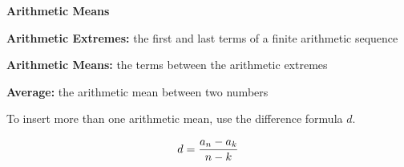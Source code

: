 \begin{center}
\textbf{Arithmetic Means}
\end{center}

\vspce


\textbf{Arithmetic Extremes:} the first and last terms of a finite arithmetic sequence 

\vspce

\textbf{Arithmetic Means:} the terms between the arithmetic extremes 

\vspce

\textbf{Average:} the arithmetic mean between two numbers  

\vspce 

To insert more than one arithmetic mean, use the difference  formula $d$. 

\begin{center}
$$\normalsize d=\frac{a_{n}-a_{k}}{n-k}$$
\end{center}